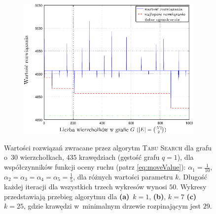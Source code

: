 \begin{figure}[!htbp]
\begin{subfigure}[b]{0.32\textwidth}
		\includegraphics[width=\textwidth]{Chapter_VI/RRIMST7-example/RRIMST7_psfrag}
		\caption{}
		\label{fig:rrimst2:c}
	\end{subfigure}
	\hfill\null
	\caption{
		Wartości rozwiązań zwracane przez algorytm \textsc{Tabu Search} dla grafu o~$30$ wierzchołkach, $435$ krawędziach (gęstość grafu $q = 1$), dla współczynników funkcji oceny ruchu (patrz \ref{eq:moveValue}): $\alpha_{1} = \frac{1}{10}$, $\alpha_{2} = \alpha_{3} = \alpha_{4} = \alpha_{5} = \frac{1}{5}$, dla różnych wartości parametru $k$. Długość każdej iteracji dla wszystkich trzech wykresów wynosi $50$. Wykresy przedstawiają przebieg algorytmu dla \textbf{(a)}~$k = 1$, \textbf{(b)}, $k = 7$ \textbf{(c)}~$k = 25$, gdzie krawędzi w~minimalnym drzewie rozpinającym jest $29$.
	}
	\label{fig:rrimst2}
\end{figure}

